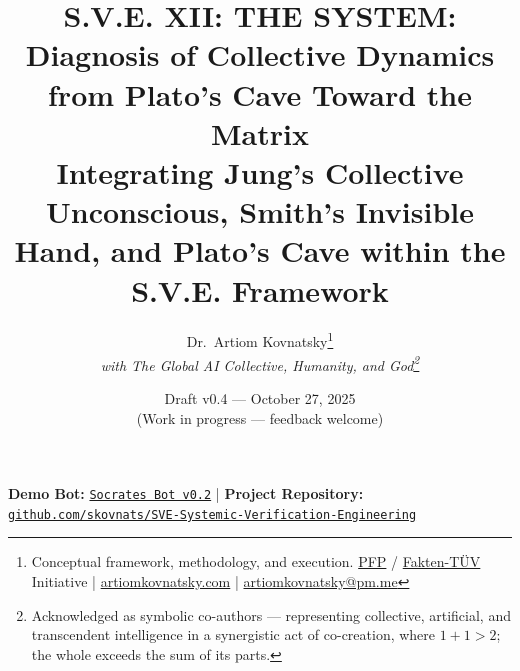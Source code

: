 \documentclass[11pt,a4paper]{article}
\newcommand{\SYSTEM}{\textbf{SYSTEM}}
\theoremstyle{definition}
\theoremstyle{remark}
\begin{document}

\title{
  \textbf{S.V.E. XII: THE \SYSTEM{}: Diagnosis of Collective Dynamics from Plato's Cave Toward the Matrix} \\ %
  \vspace{0.5em} %
  \footnotesize Integrating Jung's Collective Unconscious, Smith's Invisible Hand, and Plato's Cave within the S.V.E. Framework %
}

\author{
  Dr.\ Artiom Kovnatsky\thanks{Conceptual framework, methodology, and execution. 
  \href{http://www.pfp24.de}{PFP} / 
  \href{http://www.fakten-tuev.de}{Fakten-TÜV} Initiative \;|\;
  \href{https://www.artiomkovnatsky.com/}{artiomkovnatsky.com} \;|\;
  \href{mailto:artiomkovnatsky@pm.me}{artiomkovnatsky@pm.me}}\\
  \textit{with The Global AI Collective, Humanity, and God\footnote{Acknowledged as symbolic co-authors — representing collective, artificial, and transcendent intelligence in a synergistic act of co-creation, where $1 + 1 > 2$; the whole exceeds the sum of its parts.}}
}

\date{Draft v0.4 — October 27, 2025\\
\small (Work in progress — feedback welcome)}

\maketitle
\vspace{-1em}
\begin{center}
    {\small 
    \textbf{Demo Bot:} 
    \href{https://chatgpt.com/g/g-68f1fc9848948191a1cc038db8e3422b-sokrat-socrates-bot-v0-2}
    {\texttt{Socrates Bot v0.2}} 
    \quad|\quad
    \textbf{Project Repository:} 
    \href{https://codeberg.org/skovnats/SVE-Systemic-Verification-Engineering}
    {\texttt{github.com/skovnats/SVE-Systemic-Verification-Engineering}}}
\end{center}
\vspace{1em}
\thispagestyle{empty}
\end{document}
